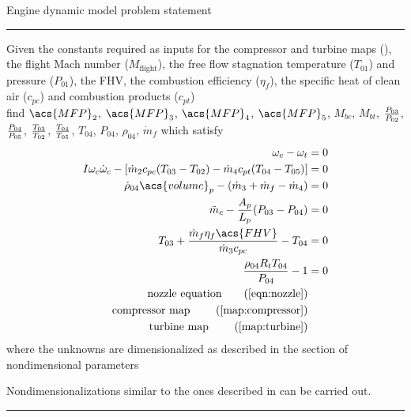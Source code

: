 \begin{table}
\centering
    \caption{Engine dynamic model problem statement}
    \label{model:dynamic}
\begin{minipage}{0.7\textwidth}
    \hrule\vspace{2pt}

    Given the constants required as inputs for the compressor and turbine maps (), 
    the flight Mach number ($M_\text{flight}$), the free flow stagnation temperature ($T_{01}$) and pressure ($P_{01}$), 
    the \acf{FHV}, the combustion efficiency ($\eta_f$),
    the specific heat of clean air ($c_{pc}$) and combustion products ($c_{pt}$) \\ 
    find $\acs{MFP}_2$, $\acs{MFP}_3$, $\acs{MFP}_4$, $\acs{MFP}_5$, $M_{bc}$, $M_{bt}$, $\frac{P_{03}}{P_{02}}$, $\frac{P_{04}}{P_{05}}$, $\frac{T_{03}}{T_{02}}$, $\frac{T_{04}}{T_{05}}$, $T_{04}$, $P_{04}$, $\rho_{04}$, $\dot{m}_f$
    which satisfy
\begin{align}
    \omega_c - \omega_t &= 0 \label{eqn:dynamic:rotation} \\
    I \omega_c\dot{\omega}_c - [\dot{m}_2 c_{pc} (T_{03}-T_{02}) - \dot{m}_4 c_{pt}(T_{04}-T_{05})] &= 0 \label{eqn:dynamic:energy}\\
    \dot{\rho}_{04}\acs{volume}_p - (\dot{m}_3 + \dot{m}_f - \dot{m}_4) &= 0 \label{eqn:dynamic:mass} \\
    \ddot{m}_c - \frac{A_p}{L_p}(P_{03}-P_{04}) &=0 \label{eqn:dynamic:momentum} \\
    T_{03} + \frac{\dot{m}_f \eta_f \acs{FHV}}{\dot{m}_3 c_{pc}} - T_{04} &= 0 \label{eqn:dynamic:burn} \\
    \frac{\rho_{04} R_t T_{04}}{P_{04}}  - 1 &= 0\\
    \text{nozzle equation} \tag{\Cref{eqn:nozzle}} \\
    \text{compressor map } \tag{\Cref{map:compressor}} \\
    \text{turbine map    } \tag{\Cref{map:turbine}}
\end{align}
   where the unknowns are dimensionalized as described in the section of nondimensional parameters

   Nondimensionalizations similar to the ones described in  can be carried out.

    \vspace{2pt}\hrule
\end{minipage}
\end{table}

